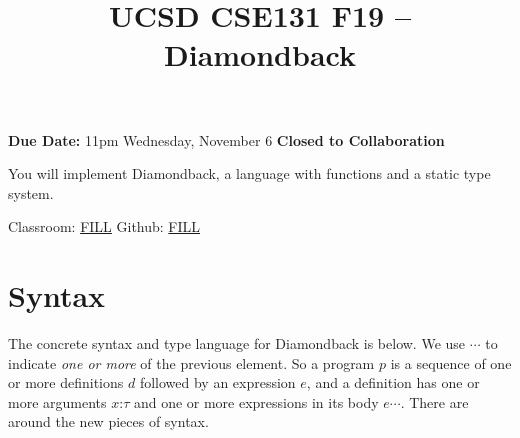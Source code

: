 \documentclass[10pt, oneside]{article}
\title{UCSD CSE131 F19 -- Diamondback}
\begin{document}
\maketitle 

{\bf Due Date:} 11pm Wednesday, November 6 \hspace{2em} {\bf Closed to Collaboration}

You will implement Diamondback, a language with functions and a static type
system.

Classroom: \url{FILL} \hspace{1em} Github: \url{FILL}


\section*{Syntax}

The concrete syntax and type language for Diamondback is below. We use
$\cdots$ to indicate \textit{one or more} of the previous element. So a
program $p$ is a sequence of one or more definitions $d$ followed by an
expression $e$, and a definition has one or more arguments $x \texttt{:}\tau$
and one or more expressions in its body $e \cdots$. There are 
around the new pieces of syntax.
\end{document}
